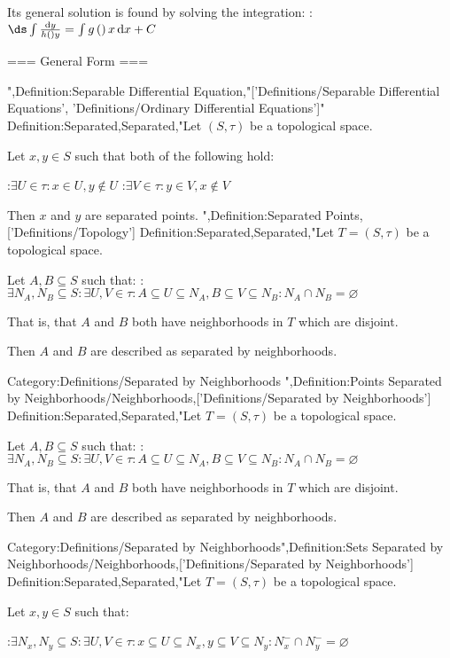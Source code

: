 Its general solution is found by solving the integration:
:$\ds \int \frac {\mathrm d y} {h \left(   \right)y} = \int g \left(   \right)x \,\mathrm d x + C$


=== General Form ===

",Definition:Separable Differential Equation,"['Definitions/Separable Differential Equations', 'Definitions/Ordinary Differential Equations']"
Definition:Separated,Separated,"Let $\left( S, \tau \right)$ be a topological space.

Let $x, y \in S$ such that both of the following hold:

:$\exists U \in \tau: x \in U, y \notin U$
:$\exists V \in \tau: y \in V, x \notin V$


Then $x$ and $y$ are separated points.
",Definition:Separated Points,['Definitions/Topology']
Definition:Separated,Separated,"Let $T = \left( S, \tau \right)$ be a topological space.


Let $A, B \subseteq S$ such that:
:$\exists N_A, N_B \subseteq S: \exists U, V \in \tau: A \subseteq U \subseteq N_A, B \subseteq V \subseteq N_B: N_A \cap N_B = \varnothing$


That is, that $A$ and $B$ both have neighborhoods in $T$ which are disjoint.


Then $A$ and $B$ are described as separated by neighborhoods.


Category:Definitions/Separated by Neighborhoods
",Definition:Points Separated by Neighborhoods/Neighborhoods,['Definitions/Separated by Neighborhoods']
Definition:Separated,Separated,"Let $T = \left( S, \tau \right)$ be a topological space.


Let $A, B \subseteq S$ such that:
:$\exists N_A, N_B \subseteq S: \exists U, V \in \tau: A \subseteq U \subseteq N_A, B \subseteq V \subseteq N_B: N_A \cap N_B = \varnothing$


That is, that $A$ and $B$ both have neighborhoods in $T$ which are disjoint.


Then $A$ and $B$ are described as separated by neighborhoods.


Category:Definitions/Separated by Neighborhoods",Definition:Sets Separated by Neighborhoods/Neighborhoods,['Definitions/Separated by Neighborhoods']
Definition:Separated,Separated,"Let $T = \left( S, \tau \right)$ be a topological space.


Let $x, y \in S$ such that:

:$\exists N_x, N_y \subseteq S: \exists U, V \in \tau: x \subseteq U \subseteq N_x, y \subseteq V \subseteq N_y: N_x^- \cap N_y^- = \varnothing$

